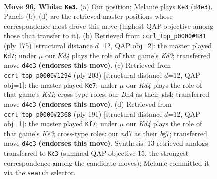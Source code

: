 \documentclass[11pt]{article}
\begin{document}
\clearpage

\begin{figure}[p]\centering
\begin{subfigure}{0.46\textwidth}\centering
\resizebox{\linewidth}{!}{%
\newchessgame
\chessboard[
  setfen={6k1/3n4/8/5P2/p2K3B/P6P/8/8 w - - 11 96},
  showmover=false,
  pgfstyle=straightmove, color=movearrow, markmove={d4-e3}
]}
\caption{}
\end{subfigure}\hfill
\begin{subfigure}{0.46\textwidth}\centering
\resizebox{\linewidth}{!}{%
\newchessgame
\chessboard[
  setfen={8/8/1K1k4/p7/P7/3N4/4p3/8 b - - 43 88},
  showmover=false,
  pgfstyle=straightmove, color=movearrow, markmove={d6-d7}
]}
\caption{}
\end{subfigure}
\\[4pt]
\begin{subfigure}{0.46\textwidth}\centering
\resizebox{\linewidth}{!}{%
\newchessgame
\chessboard[
  setfen={3k4/6p1/8/8/1p2K2P/8/1P6/8 b - - 0 102},
  showmover=false,
  pgfstyle=straightmove, color=movearrow, markmove={d8-e7}
]}
\caption{}
\end{subfigure}\hfill
\begin{subfigure}{0.46\textwidth}\centering
\resizebox{\linewidth}{!}{%
\newchessgame
\chessboard[
  setfen={8/6B1/p3k3/K6p/7P/8/2b5/8 b - - 21 96},
  showmover=false,
  pgfstyle=straightmove, color=movearrow, markmove={e6-f7}
]}
\caption{}
\end{subfigure}
\caption{\textbf{Move 96, White: \texttt{Ke3}.} (a) Our position; Melanie plays \texttt{Ke3} (\texttt{d4e3}). Panels (b)--(d) are the retrieved master positions whose correspondence most drove this move (highest QAP objective among those that transfer to it). (b) Retrieved from \texttt{ccrl\_top\_p0000\#831} (ply 175) [structural distance $d$=12, QAP obj=2]: the master played \texttt{Kd7}; under $\mu$ our \emph{Kd4} plays the role of that game's \emph{Kd3}; transferred move \texttt{d4e3} \textbf{(endorses this move)}. (c) Retrieved from \texttt{ccrl\_top\_p0000\#1294} (ply 203) [structural distance $d$=12, QAP obj=1]: the master played \texttt{Ke7}; under $\mu$ our \emph{Kd4} plays the role of that game's \emph{Kd1}; cross-type roles: our \emph{B}h4 as their \emph{p}h4; transferred move \texttt{d4e3} \textbf{(endorses this move)}. (d) Retrieved from \texttt{ccrl\_top\_p0000\#2368} (ply 191) [structural distance $d$=12, QAP obj=1]: the master played \texttt{Kf7}; under $\mu$ our \emph{Kd4} plays the role of that game's \emph{Ke3}; cross-type roles: our \emph{n}d7 as their \emph{b}g7; transferred move \texttt{d4e3} \textbf{(endorses this move)}. Synthesis: 13 retrieved analogs transferred to \texttt{Ke3} (summed QAP objective 15, the strongest correspondence among the candidate moves); Melanie committed it via the \texttt{search} selector.}
\label{fig:thought-m190}
\end{figure}
\end{document}
